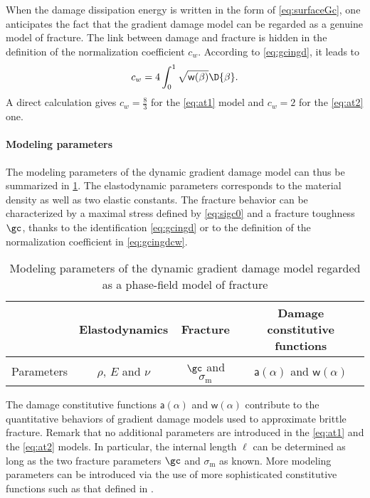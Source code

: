 When the damage dissipation energy is written in the form of \eqref{eq:surfaceGc}, one anticipates the fact that the gradient damage model can be regarded as a genuine model of fracture. The link between damage and fracture is hidden in the definition of the normalization coefficient $c_w$. According to \eqref{eq:gcingd}, it leads to
\begin{equation} \label{eq:gcingdcw}
c_w=4\int_0^1\sqrt{\mathsf{w}(\beta)}\D{\beta}.
\end{equation}
A direct calculation gives $c_w=\frac{8}{3}$ for the \eqref{eq:at1} model and $c_w=2$ for the \eqref{eq:at2} one.

\paragraph{Modeling parameters} The modeling parameters of the dynamic gradient damage model can thus be summarized in \cref{tab:modelgrad}. The elastodynamic parameters corresponds to the material density as well as two elastic constants. The fracture behavior can be characterized by a maximal stress defined by \eqref{eq:sigc0} and a fracture toughness $\gc$, thanks to the identification \eqref{eq:gcingd} or to the definition of the normalization coefficient in \eqref{eq:gcingdcw}.
\begin{table}[htbp]
\centering
\caption{Modeling parameters of the dynamic gradient damage model regarded as a phase-field model of fracture} \label{tab:modelgrad}
\begin{tabular}{cccc} \toprule
& Elastodynamics & Fracture & Damage constitutive functions \\ \midrule
Parameters & $\rho$, $E$ and $\nu$ & $\gc$ and $\sigma_\mathrm{m}$ &  $\mathsf{a}(\alpha)$ and $\mathsf{w}(\alpha)$ \\ \bottomrule
\end{tabular}
\end{table}

The damage constitutive functions $\mathsf{a}(\alpha)$ and $\mathsf{w}(\alpha)$ contribute to the quantitative behaviors of gradient damage models used to approximate brittle fracture. Remark that no additional parameters are introduced in the \eqref{eq:at1} and the \eqref{eq:at2} models. In particular, the internal length $\ell$ can be determined as long as the two fracture parameters $\gc$ and $\sigma_\mathrm{m}$ as known. More modeling parameters can be introduced via the use of more sophisticated constitutive functions such as that defined in \cite{LorentzCuvilliezKazymyrenko:2012,AlessiMarigoVidoli:2015}.

